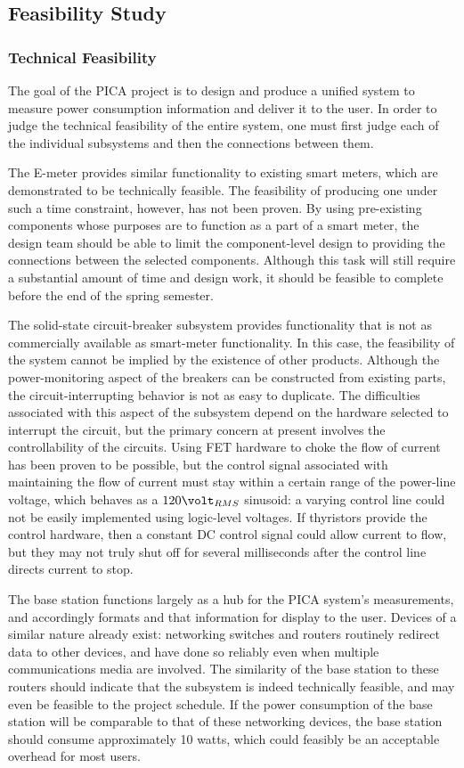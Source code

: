 \subsection{Feasibility Study}
\subsubsection{Technical Feasibility} %
The goal of the PICA project is to design and produce a unified system to measure power consumption information and deliver it to the user. In order to judge the technical feasibility of the entire system, one must first judge each of the individual subsystems and then the connections between them.

The E-meter provides similar functionality to existing smart meters, which are demonstrated to be technically feasible. The feasibility of producing one under such a time constraint, however, has not been proven. By using pre-existing components whose purposes are to function as a part of a smart meter, the design team should be able to limit the component-level design to providing the connections between the selected components. Although this task will still require a substantial amount of time and design work, it should be feasible to complete before the end of the spring semester.

The solid-state circuit-breaker subsystem provides functionality that is not as commercially available as smart-meter functionality. In this case, the feasibility of the system cannot be implied by the existence of other products. Although the power-monitoring aspect of the breakers can be constructed from existing parts, the circuit-interrupting behavior is not as easy to duplicate. The difficulties associated with this aspect of the subsystem depend on the hardware selected to interrupt the circuit, but the primary concern at present involves the controllability of the circuits. Using \ac{FET} hardware to choke the flow of current has been proven to be possible, but the control signal associated with maintaining the flow of current must stay within a certain range of the power-line voltage, which behaves as a $120 \volt_{RMS}$ sinusoid: a varying control line could not be easily implemented using logic-level voltages. If thyristors provide the control hardware, then a constant  \ac{DC} control signal could allow current to flow, but they may not truly shut off for several milliseconds after the control line directs current to stop.

The base station functions largely as a hub for the PICA system's measurements, and accordingly formats and that information for display to the user. Devices of a similar nature already exist: networking switches and routers routinely redirect data to other devices, and have done so reliably even when multiple communications media are involved. The similarity of the base station to these routers should indicate that the subsystem is indeed technically feasible, and may even be feasible to the project schedule. If the power consumption of the base station will be comparable to that of these networking devices, the base station should consume approximately 10 watts, which could feasibly be an acceptable overhead for most users.

